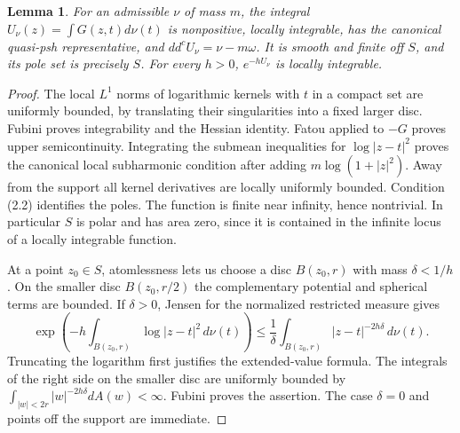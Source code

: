 \documentclass[11pt]{article}
\newtheorem{lemma}[theorem]{Lemma}
\theoremstyle{remark}\newtheorem{remark}[theorem]{Remark}
\newcommand{\ddc}{dd^c}
\begin{document}
\begin{lemma}\label{curvelemma}
For an admissible $\nu$ of mass $m$, the integral
$U_\nu(z)=\int G(z,t)d\nu(t)$ is nonpositive, locally integrable,
has the canonical quasi-psh representative, and
$\ddc U_\nu=\nu-m\omega$. It is smooth and finite off $S$,
and its pole set is precisely $S$. For every $h>0$,
$e^{-hU_\nu}$ is locally integrable.
\end{lemma}
\begin{proof}
The local $L^1$ norms of logarithmic kernels with $t$ in a compact
set are uniformly bounded, by translating their singularities into
a fixed larger disc. Fubini proves integrability and the Hessian
identity. Fatou applied to $-G$ proves upper semicontinuity.
Integrating the submean inequalities for $\log|z-t|^2$ proves the
canonical local subharmonic condition after adding $m\log(1+|z|^2)$.
Away from the support all kernel derivatives are locally uniformly
bounded. Condition (2.2) identifies the poles. The function is finite
near infinity, hence nontrivial. In particular $S$ is polar and has
area zero, since it is contained in the infinite locus of a locally
integrable function.

At a point $z_0\in S$, atomlessness lets us choose a disc $B(z_0,r)$
with mass $\delta<1/h$. On the smaller disc $B(z_0,r/2)$ the
complementary potential and spherical terms are bounded.
If $\delta>0$, Jensen for the normalized restricted measure gives
\[
 \exp\left(-h\int_{B(z_0,r)}\log|z-t|^2\,d\nu(t)\right)
 \leq\frac1\delta\int_{B(z_0,r)}|z-t|^{-2h\delta}\,d\nu(t).
 \tag{2.3}
\]
Truncating the logarithm first justifies the extended-value formula.
The integrals of the right side on the smaller disc are uniformly
bounded by $\int_{|w|<2r}|w|^{-2h\delta}dA(w)<\infty$.
Fubini proves the assertion. The case $\delta=0$ and points off
the support are immediate.
\end{proof}
\end{document}
